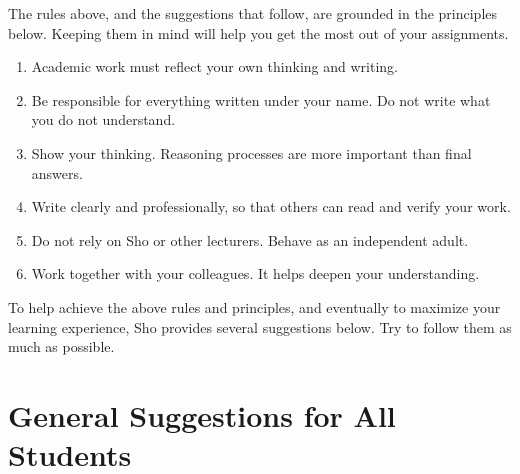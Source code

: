 \documentclass[11pt,pdfa,lastpage,minititle]{MishoNote}
\def\RL#1{\Emph*{[#1]~~}}
\begin{document}
\bigskip

\noindent
The rules above, and the suggestions that follow, are grounded in the principles below.
Keeping them in mind will help you get the most out of your assignments.

\begin{enumerate}[label=\Emph*{\arabic*.}]
  \item \RL{Authorship} Academic work must reflect your own thinking and writing.
  \item \RL{Integrity} Be responsible for everything written under your name. Do not write what you do not understand.
  \item \RL{Reasoning} Show your thinking. Reasoning processes are more important than final answers.
  \item \RL{Clarity} Write clearly and professionally, so that others can read and verify your work.
  \item \RL{Independence} Do not rely on Sho or other lecturers. Behave as an independent adult.
  \item \RL{Collaboration} Work together with your colleagues. It helps deepen your understanding.
\end{enumerate}
To help achieve the above rules and principles, and eventually to maximize your learning experience, Sho provides several suggestions below. Try to follow them as much as possible.
\newpage
\section*{General Suggestions for All Students}
\end{document}
